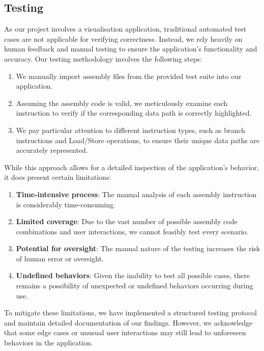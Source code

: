 \documentclass[10pt]{article}
\begin{document}
\subsection{Testing}
As our project involves a visualisation application, traditional automated test cases are not applicable for verifying correctness. Instead, we rely heavily on human feedback and manual testing to ensure the application's functionality and accuracy.
Our testing methodology involves the following steps:
\begin{enumerate}
\item We manually import assembly files from the provided test suite into our application.
\item Assuming the assembly code is valid, we meticulously examine each instruction to verify if the corresponding data path is correctly highlighted.
\item We pay particular attention to different instruction types, such as branch instructions and Load/Store operations, to ensure their unique data paths are accurately represented.
\end{enumerate}
While this approach allows for a detailed inspection of the application's behavior, it does present certain limitations:
\begin{enumerate}
\item \textbf{Time-intensive process}: The manual analysis of each assembly instruction is considerably time-consuming.
\item \textbf{Limited coverage}: Due to the vast number of possible assembly code combinations and user interactions, we cannot feasibly test every scenario.
\item \textbf{Potential for oversight}: The manual nature of the testing increases the risk of human error or oversight.
\item \textbf{Undefined behaviors}: Given the inability to test all possible cases, there remains a possibility of unexpected or undefined behaviors occurring during use.
\end{enumerate}
To mitigate these limitations, we have implemented a structured testing protocol and maintain detailed documentation of our findings. However, we acknowledge that some edge cases or unusual user interactions may still lead to unforeseen behaviors in the application. \\
\\
\end{document}
